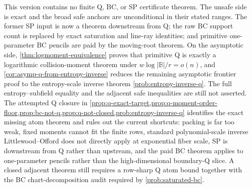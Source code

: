 \documentclass[a4paper,11pt]{amsart}
\theoremstyle{remark}
\newcommand{\B}{\mathbb B}
\begin{document}
This version contains no finite Q, BC, or SP certificate theorem.  The unsafe side is exact and the broad safe anchors are unconditional in their stated ranges.  The former SP input is now a theorem downstream from Q; the raw BC support count is replaced by exact saturation and line-ray identities; and primitive one-parameter BC pencils are paid by the moving-root theorem.  On the asymptotic side, \cref{thm:logmoment-equivalence} proves that primitive Q is exactly a logarithmic collision-moment theorem under \(w\log|\B|/r=o(n)\), and \cref{cor:asymp-q-from-entropy-inverse} reduces the remaining asymptotic frontier proof to the entropy-scale inverse theorem \cref{prob:entropy-inverse-q}.  The full entropy--subfield equality and the adjacent safe inequalities are still not asserted.  The attempted Q closure in \cref{prop:q-exact-target,prop:q-moment-order-floor,prop:bc-not-q,prop:q-not-closed,prob:entropy-inverse-q} identifies the exact missing atom theorem and rules out the current shortcuts: packing is far too weak, fixed moments cannot fit the finite rows, standard polynomial-scale inverse Littlewood--Offord does not directly apply at exponential fiber scale, SP is downstream from Q rather than upstream, and the paid BC theorem applies to one-parameter pencils rather than the high-dimensional boundary-Q slice.  A closed adjacent theorem still requires a row-sharp Q atom bound together with the BC chart-decomposition audit required by \cref{prob:saturated-bc}.
\end{document}
